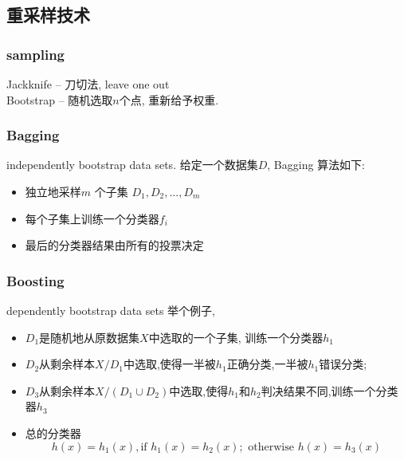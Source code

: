 \documentclass[12pt,letterpaper]{article}
\begin{document}
 \subsection{重采样技术}
 \subsubsection{sampling}
 Jackknife -- 刀切法, leave one out \\
 Bootstrap -- 随机选取$n$个点, 重新给予权重.
 \subsubsection{Bagging}
 independently bootstrap data sets.
 给定一个数据集$D$, Bagging
算法如下:
\begin{itemize}
	\item 独立地采样$m$ 个子集 $D_1,D_2, ..., D_m$
	\item 每个子集上训练一个分类器$f_i$
	\item 最后的分类器结果由所有的投票决定
\end{itemize}
 \subsubsection{Boosting}
 dependently bootstrap data sets
 举个例子,
 \begin{itemize}
 	\item $D_1$是随机地从原数据集$X$中选取的一个子集, 训练一个分类器$h_1$
 	\item $D_2$从剩余样本$X/D_1$中选取,使得一半被$h_1$正确分类,一半被$h_1$错误分类;
 	\item $D_3$从剩余样本$X/(D_1\cup D_2)$中选取,使得$h_1$和$h_2$判决结果不同,训练一个分类器$h_3$
 	\item 总的分类器
 	\[
		 h(x) = h_1(x) , \text{if } h_1(x) = h_2(x); \text{ otherwise } h(x) = h_3(x)
 	\]
 \end{itemize}
 
 
 
\end{document}
